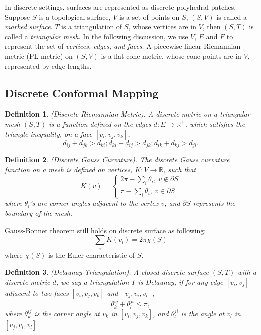 \documentclass[runningheads]{llncs}
\newtheorem{mydef}{Definition}
\begin{document}
In discrete settings, surfaces are represented as discrete polyhedral patches. Suppose $S$ is a topological surface, $V$ is a set of points on $S$, $(S,V)$ is called a \textit{marked surface}. $T$ is a triangulation of $S$, whose vertices are in $V$, then $(S,T)$ is called a \textit{triangular mesh}. In the following discussion, we use $V$, $E$ and $F$ to represent the set of \textit{vertices, edges, and faces}. A piecewise linear Riemannian metric (PL metric) on $(S,V)$ is a flat cone metric, whose cone points are in $V$, represented by edge lengths.

\subsection{Discrete Conformal Mapping}


\begin{mydef}
(Discrete Riemannian Metric). A discrete metric on a triangular mesh $(S,T)$ is a function defined on the edges $d:E\rightarrow \mathbb{R}^+$, which satisfies the triangle inequality, on a face $[v_i,v_j,v_k]$, $$d_{ij}+d_{jk}>d_{ki};d_{ki}+d_{ij}>d_{jk};d_{ik}+d_{kj}>d_{ji}.$$
\end{mydef}

\begin{mydef}
(Discrete Gauss Curvature). The discrete Gauss curvature function on a mesh is defined on vertices, $K: V\rightarrow \mathbb{R}$, such that
\[
	K(v)=\begin{cases}
			2\pi-\sum_i\theta_i,\ v\notin\partial S\\
			\pi-\sum_i\theta_i, \ v\in\partial S
		\end{cases}			
\]
where $\theta_i$'s are corner angles adjacent to the vertex $v$, and $\partial S$ represents the boundary of the mesh.
\end{mydef}

Gauss-Bonnet theorem still holds on discrete surface as following: $$\sum_i K(v_i)=2\pi\chi(S)$$
where $\chi(S)$ is the Euler characteristic of $S$.


\begin{mydef}
(Delaunay Triangulation). A closed discrete surface $(S,T)$ with a discrete metric $d$, we say a triangulation $T$ is Delaunay, if for any edge $[v_i,v_j]$ adjacent to two faces $[v_i,v_j,v_k]$ and $[v_j,v_i,v_l]$, $$\theta_k^{ij}+\theta_l^{ji}\leq \pi,$$ where $\theta_k^{ij}$ is the corner angle at $v_k$ in $[v_i,v_j,v_k]$, and $\theta_l^{ji}$ is the angle at $v_l$ in $[v_j,v_i,v_l]$.
\end{mydef}
\end{document}
